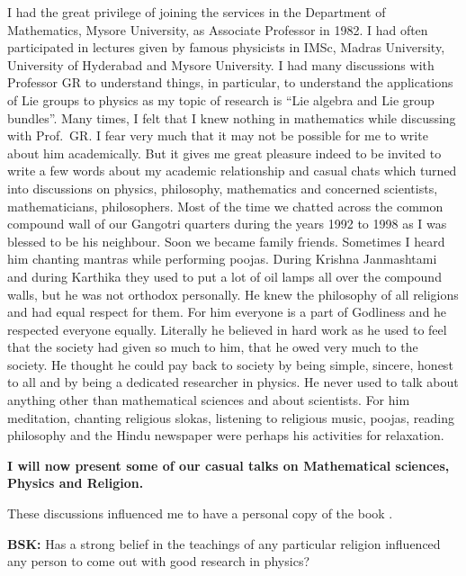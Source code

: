 I had the great privilege of joining the services in the Department of Mathematics, Mysore University, as Associate Professor in 1982. I had often participated in lectures given by famous physicists in IMSc, Madras University, University of Hyderabad and Mysore University. I had many discussions with Professor GR to understand things, in particular, to understand the applications of Lie groups to physics as my topic of research is “Lie algebra and Lie group bundles”. Many times, I felt that I knew nothing in mathematics while discussing with Prof.\ GR. I fear very much that it may not be possible for me to write about him academically. But it gives me great pleasure indeed to be invited to write a few words about my academic relationship and casual chats which turned into discussions on physics, philosophy, mathematics and concerned scientists, mathematicians, philosophers. Most of the time we chatted across the common compound wall of our Gangotri quarters during the years 1992 to 1998 as I was blessed to be his neighbour. Soon we became family friends. Sometimes I heard him chanting mantras while performing poojas. During Krishna Janmashtami and during Karthika they used to put a lot of oil lamps all over the compound walls, but he was not orthodox personally. He knew the philosophy of all religions and had equal respect for them. For him everyone is a part of Godliness and he respected everyone equally. Literally he believed in hard work as he used to feel that the society had given so much to him, that he owed very much to the society. He thought he could pay back to society by being simple, sincere, honest to all and by being a dedicated researcher in physics. He never used to talk about anything other than mathematical sciences and about scientists. For him meditation, chanting religious slokas, listening to religious music, poojas, reading philosophy and the Hindu newspaper were perhaps his activities for relaxation.

\textbf{I will now present some of our casual talks on Mathematical sciences, Physics and Religion.}

These discussions influenced me to have a personal copy of the book \cite{chap17-key04MJL}.  

\textbf{BSK:} Has a strong belief in the teachings of any particular religion influenced any person to come out with good research in physics?

